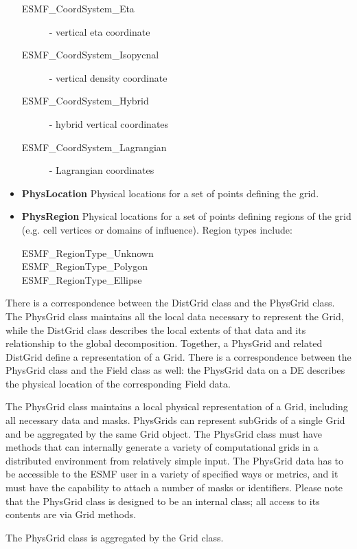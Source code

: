 \begin{itemize}
\begin{description}
\item[ESMF\_CoordSystem\_Eta] - vertical eta coordinate
\item[ESMF\_CoordSystem\_Isopycnal] - vertical density coordinate
\item[ESMF\_CoordSystem\_Hybrid] - hybrid vertical coordinates
\item[ESMF\_CoordSystem\_Lagrangian] - Lagrangian coordinates
\end{description}
\item {\bf PhysLocation} Physical locations for a set of points defining the grid.
\item {\bf PhysRegion} Physical locations for a set of points defining regions of
the grid (e.g. cell vertices or domains of influence).  Region types include:
\begin{description}
\item[ESMF\_RegionType\_Unknown]
\item[ESMF\_RegionType\_Polygon]
\item[ESMF\_RegionType\_Ellipse]
\end{description}
\end{itemize}






There is a correspondence between the DistGrid class and the PhysGrid
class.  The PhysGrid class maintains all the local data necessary to
represent the Grid, while the DistGrid class describes the local extents
of that data and its relationship to the global decomposition.
Together, a PhysGrid and related DistGrid define a representation of
a Grid.  There is a correspondence between the PhysGrid class and the Field
class as well:  the PhysGrid data on a DE describes the physical location
of the corresponding Field data.

The PhysGrid class maintains a local physical representation of a Grid,
including all necessary data and masks.  PhysGrids can represent subGrids
of a single Grid and be aggregated by the same Grid object. The PhysGrid
class must have methods that can internally generate a variety of
computational grids in a distributed environment from relatively simple
input.  The PhysGrid data has to be accessible to the ESMF user in a
variety of specified ways or metrics, and it must have the capability to
attach a number of masks or identifiers.  Please note that the PhysGrid class
is designed to be an internal class; all access to its contents are via
Grid methods.


The PhysGrid class is aggregated by the Grid class.
